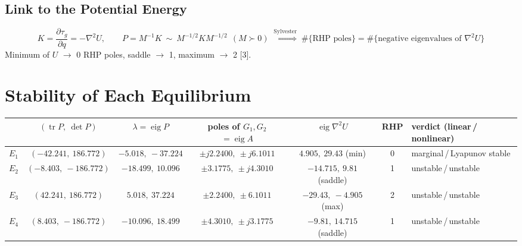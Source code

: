 \documentclass[10pt,letterpaper]{article}
\newenvironment{keep}{\par\noindent\begin{minipage}{\linewidth}}{\end{minipage}\par\smallskip}
\begin{document}
\begin{keep}
\subsection{Link to the Potential Energy}
\begin{equation}
K=\frac{\partial\tau_g}{\partial q}=-\nabla^2U,\qquad
P=M^{-1}K\ \sim\ M^{-1/2}KM^{-1/2}\ \ (M\succ0)
\;\overset{\text{Sylvester}}{\Longrightarrow}\;
\boxed{\#\{\text{RHP poles}\}=\#\{\text{negative eigenvalues of }\nabla^2U\}}\label{eq:inertia}
\end{equation}
Minimum of $U$ $\to$ 0 RHP poles, saddle $\to$ 1, maximum $\to$ 2 [3].

\end{keep}
\begin{keep}
\section{Stability of Each Equilibrium}
\begin{center}
\label{tab:stab}
\footnotesize\setlength{\tabcolsep}{4pt}\renewcommand{\arraystretch}{0.95}
\begin{tabular}{@{}ccccccl@{}}
\toprule
 & $(\operatorname{tr}P,\ \det P)$ & $\lambda=\operatorname{eig}P$ & poles of $G_1,G_2$ $=\operatorname{eig}A$ & $\operatorname{eig}\nabla^2U$ & RHP & verdict (linear\,/\,nonlinear)\\
\midrule
$E_1$ & $(-42.241,\ 186.772)$ & $-5.018,\ -37.224$ & $\pm j2.2400,\ \pm j6.1011$ & $4.905,\ 29.43$ (min) & 0 & marginal\,/\,Lyapunov stable\\
$E_2$ & $(-8.403,\ -186.772)$ & $-18.499,\ 10.096$ & $\pm3.1775,\ \pm j4.3010$ & $-14.715,\ 9.81$ (saddle) & 1 & unstable\,/\,unstable\\
$E_3$ & $(42.241,\ 186.772)$ & $5.018,\ 37.224$ & $\pm2.2400,\ \pm6.1011$ & $-29.43,\ -4.905$ (max) & 2 & unstable\,/\,unstable\\
$E_4$ & $(8.403,\ -186.772)$ & $-10.096,\ 18.499$ & $\pm4.3010,\ \pm j3.1775$ & $-9.81,\ 14.715$ (saddle) & 1 & unstable\,/\,unstable\\
\bottomrule
\end{tabular}
\end{center}
\end{keep}
\end{document}
